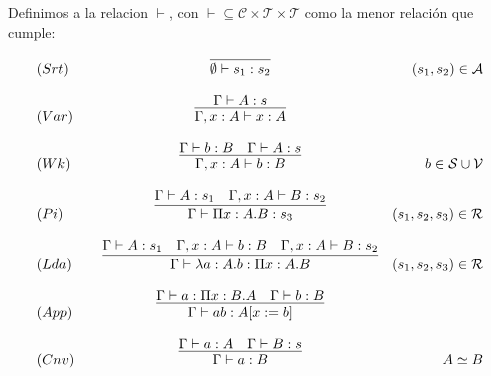 \begin{definition}Definimos a la relacion $\vdash$, con $\vdash \subseteq \mathcal{C}\times\mathcal{T}\times\mathcal{T}$ como
la menor relación que cumple:


\[
\begin{array}{llcr}
	(Srt) & &\infer{\emptyset \vdash s_{1} : s_{2}}{} & (s_{1},s_{2}) \in\mathcal{A} \\ \\
	(Var) & &\infer{\Gamma, x:A \vdash x:A}{\Gamma\vdash A:s} & \\ \\
	(Wk)  & &\infer{\Gamma, x:A \vdash b:B}{\Gamma\vdash b:B & \Gamma\vdash A:s} & b\in\mathcal{S}\cup\mathcal{V} \\ \\
	(Pi)  & &\infer{\Gamma \vdash \Pi x:A.B : s_{3}}{\Gamma\vdash A:s_{1} & \Gamma, x:A \vdash B:s_{2}} &  (s_1,s_2,s_3)\in\mathcal{R}\\ \\
	(Lda) & &\infer{\Gamma \vdash \lambda a:A.b : \Pi x:A.B }{\Gamma\vdash A:s_{1} & \Gamma, x:A \vdash b:B &\Gamma, x:A \vdash B:s_{2}} &  (s_1,s_2,s_3)\in\mathcal{R}\\ \\
	(App) & &\infer{\Gamma \vdash a b : A[x:= b] }{\Gamma\vdash a : \Pi x:B.A & \Gamma \vdash b:B} &  \\ \\
	(Cnv) & &\infer{\Gamma \vdash a:B}{\Gamma\vdash a:A & \Gamma\vdash B:s} & A \simeq B \\ \\
	
\end{array}
\]

\end{definition}

